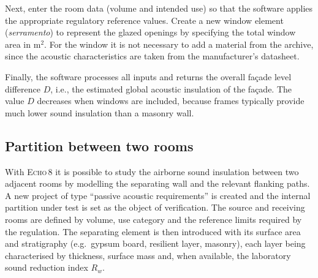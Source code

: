 Next, enter the room data (volume and intended use) so that the software applies the appropriate regulatory reference values. Create a new window element (\textit{serramento}) to represent the glazed openings by specifying the total window area in \(\mathrm{m^2}\). For the window it is not necessary to add a material from the archive, since the acoustic characteristics are taken from the manufacturer’s datasheet.

Finally, the software processes all inputs and returns the overall façade level difference \(D\), i.e., the estimated global acoustic insulation of the façade. The value \(D\) decreases when windows are included, because frames typically provide much lower sound insulation than a masonry wall.


\subsection{Partition between two rooms}

With \textsc{Echo\,8} it is possible to study the airborne sound insulation between two adjacent rooms by modelling the separating wall and the relevant flanking paths. A new project of type ``passive acoustic requirements'' is created and the internal partition under test is set as the object of verification. The source and receiving rooms are defined by volume, use category and the reference limits required by the regulation. The separating element is then introduced with its surface area and stratigraphy (e.g.\ gypsum board, resilient layer, masonry), each layer being characterised by thickness, surface mass and, when available, the laboratory sound reduction index \(R_w\).

